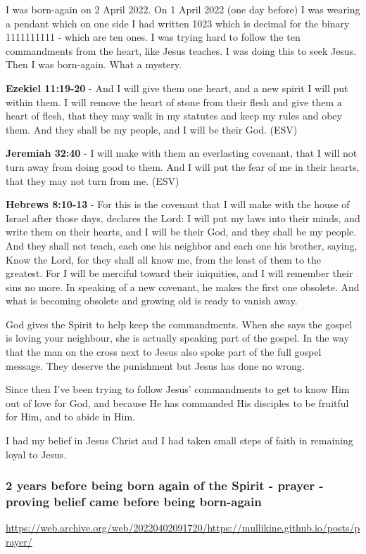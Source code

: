 \documentclass[11pt]{article}
\begin{document}
I was born-again on 2 April 2022. On 1 April 2022 (one day before) I was wearing a pendant which on one side I had written 1023 which is decimal for the binary 1111111111 - which are ten ones. I was trying hard to follow the ten commandments from the heart, like Jesus teaches. I was doing this to seek Jesus. Then I was born-again. What a mystery.

\textbf{Ezekiel 11:19-20} - And I will give them one heart, and a new spirit I will put within them. I will remove the heart of stone from their flesh and give them a heart of flesh, that they may walk in my statutes and keep my rules and obey them. And they shall be my people, and I will be their God. (ESV)

\textbf{Jeremiah 32:40} - I will make with them an everlasting covenant, that I will not turn away from doing good to them. And I will put the fear of me in their hearts, that they may not turn from me. (ESV)

\textbf{Hebrews 8:10-13} - For this is the covenant that I will make with the house of Israel after those days, declares the Lord: I will put my laws into their minds, and write them on their hearts, and I will be their God, and they shall be my people. And they shall not teach, each one his neighbor and each one his brother, saying, Know the Lord, for they shall all know me, from the least of them to the greatest. For I will be merciful toward their iniquities, and I will remember their sins no more. In speaking of a new covenant, he makes the first one obsolete. And what is becoming obsolete and growing old is ready to vanish away.

God gives the Spirit to help keep the commandments. When she says the gospel is loving your neighbour, she is actually speaking part of the gospel. In the way that the man on the cross next to Jesus also spoke part of the full gospel message. They deserve the punishment but Jesus has done no wrong.

Since then I've been trying to follow Jesus' commandments to get to know Him out of love for God, and because He has commanded His disciples to be fruitful for Him, and to abide in Him.

I had my belief in Jesus Christ and I had taken small steps of faith in remaining loyal to Jesus.

\subsubsection{2 years before being born again of the Spirit - prayer - proving belief came before being born-again}
\label{sec:orga49be3d}
\url{https://web.archive.org/web/20220402091720/https://mullikine.github.io/posts/prayer/}
\end{document}
